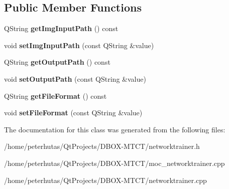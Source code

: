 \subsection*{Public Member Functions}
\begin{DoxyCompactItemize}
\item 
\mbox{\label{class_network_trainer_a7c5becac192d361a6a418f948a76f7a5}} 
Q\+String {\bfseries get\+Img\+Input\+Path} () const
\item 
\mbox{\label{class_network_trainer_a6719d9dc8858b4372dc65795f26b3209}} 
void {\bfseries set\+Img\+Input\+Path} (const Q\+String \&value)
\item 
\mbox{\label{class_network_trainer_a0aa7980d96e29aa9affb7754894e0771}} 
Q\+String {\bfseries get\+Output\+Path} () const
\item 
\mbox{\label{class_network_trainer_afedbe148f3bbbce778c0020d030374fd}} 
void {\bfseries set\+Output\+Path} (const Q\+String \&value)
\item 
\mbox{\label{class_network_trainer_a5650ac4c8bd07936dd2e066d7ecdcea9}} 
Q\+String {\bfseries get\+File\+Format} () const
\item 
\mbox{\label{class_network_trainer_a1f056b38ca624d6af80739d1def4e578}} 
void {\bfseries set\+File\+Format} (const Q\+String \&value)
\end{DoxyCompactItemize}


The documentation for this class was generated from the following files\+:\begin{DoxyCompactItemize}
\item 
/home/peterhutas/\+Qt\+Projects/\+D\+B\+O\+X-\/\+M\+T\+C\+T/networktrainer.\+h\item 
/home/peterhutas/\+Qt\+Projects/\+D\+B\+O\+X-\/\+M\+T\+C\+T/moc\+\_\+networktrainer.\+cpp\item 
/home/peterhutas/\+Qt\+Projects/\+D\+B\+O\+X-\/\+M\+T\+C\+T/networktrainer.\+cpp\end{DoxyCompactItemize}
